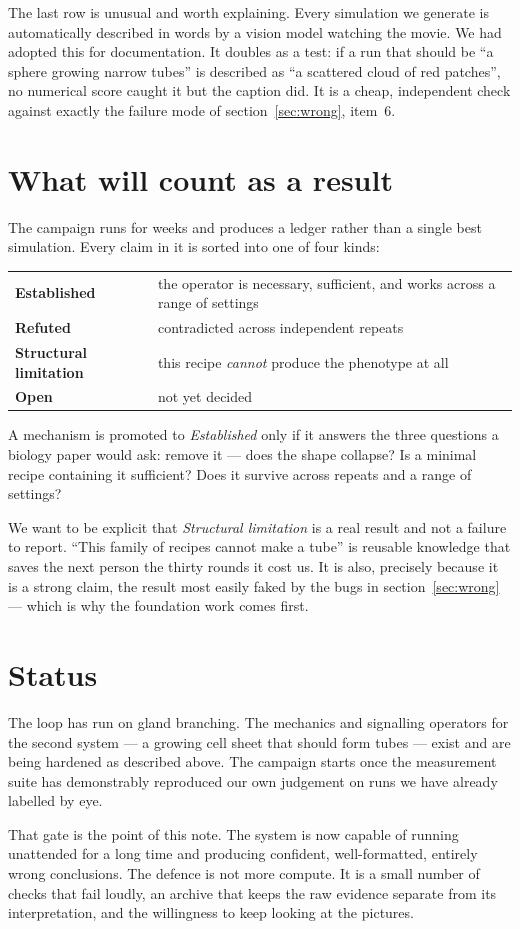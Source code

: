 \documentclass[11pt]{article}
\begin{document}
The last row is unusual and worth explaining. Every simulation we generate is automatically
described in words by a vision model watching the movie. We had adopted this for documentation.
It doubles as a test: if a run that should be ``a sphere growing narrow tubes'' is described as
``a scattered cloud of red patches'', no numerical score caught it but the caption did. It is a
cheap, independent check against exactly the failure mode of section~\ref{sec:wrong}, item~6.

\section{What will count as a result}

The campaign runs for weeks and produces a ledger rather than a single best simulation. Every
claim in it is sorted into one of four kinds:

\begin{center}
\small
\begin{tabular}{@{}ll@{}}
\toprule
\textbf{Established} & the operator is necessary, sufficient, and works across a range of settings \\
\textbf{Refuted} & contradicted across independent repeats \\
\textbf{Structural limitation} & this recipe \emph{cannot} produce the phenotype at all \\
\textbf{Open} & not yet decided \\
\bottomrule
\end{tabular}
\end{center}

A mechanism is promoted to \emph{Established} only if it answers the three questions a biology
paper would ask: remove it --- does the shape collapse? Is a minimal recipe containing it
sufficient? Does it survive across repeats and a range of settings?

We want to be explicit that \emph{Structural limitation} is a real result and not a failure to
report. ``This family of recipes cannot make a tube'' is reusable knowledge that saves the next
person the thirty rounds it cost us. It is also, precisely because it is a strong claim, the
result most easily faked by the bugs in section~\ref{sec:wrong} --- which is why the foundation
work comes first.

\section{Status}

The loop has run on gland branching. The mechanics and signalling operators for the second
system --- a growing cell sheet that should form tubes --- exist and are being hardened as
described above. The campaign starts once the measurement suite has demonstrably reproduced our
own judgement on runs we have already labelled by eye.

That gate is the point of this note. The system is now capable of running unattended for a long
time and producing confident, well-formatted, entirely wrong conclusions. The defence is not
more compute. It is a small number of checks that fail loudly, an archive that keeps the raw
evidence separate from its interpretation, and the willingness to keep looking at the pictures.
\end{document}
